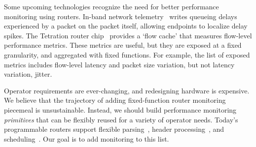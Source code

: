 Some upcoming technologies recognize the need for better performance monitoring
using routers. In-band network telemetry~\cite{int} writes queueing delays
experienced by a packet on the packet itself, allowing endpoints to localize
delay spikes. The Tetration router chip~\cite{tetration-telemetry} provides a
`flow cache' that measures flow-level performance metrics.
%
These metrics are useful, but they are exposed at a fixed granularity, and
aggregated with fixed functions. For example, the list of exposed metrics
includes flow-level latency and packet size variation, but not latency
variation, \ie jitter.

Operator requirements are ever-changing, and redesigning hardware is
expensive. We believe that the trajectory of adding fixed-function router
monitoring piecemeal is unsustainable. Instead, we should build performance
monitoring {\em primitives} that can be flexibly reused for a variety of
operator needs.
Today's programmable routers support flexible parsing~\cite{gibb_parsing},
header processing~\cite{rmt, domino_sigcomm}, and
scheduling~\cite{pifo_sigcomm}. Our goal is to add monitoring to this list.

